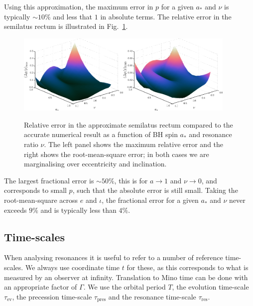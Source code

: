 \documentclass[aps,prd,amsfonts,amssymb,amsmath,nofootinbib,reprint,showpacs,superscriptaddress,twocolumn]{revtex4}
\newcommand{\figref}[1]{Fig.\ \ref{fig:#1}}
\newcommand{\sub}[1]{\ensuremath{_\text{#1}}}
\begin{document}
Using this approximation, the maximum error in $p$ for a given $a_\ast$ and $\nu$ is typically $\sim10\%$ and less that $1$ in absolute terms. The relative error in the semilatus rectum is illustrated in \figref{p-error}. 
\begin{figure}[htp]
\centering
\centerline{\includegraphics[width=0.47\textwidth]{Fig_fit-error-max-plane}\quad\includegraphics[width=0.47\textwidth]{Fig_fit-error-RMS-plane}}
\caption{\label{fig:p-error}Relative error in the approximate semilatus rectum compared to the accurate numerical result as a function of BH spin $a_\ast$ and resonance ratio $\nu$. The left panel shows the maximum relative error and the right shows the root-mean-square error; in both cases we are marginalising over eccentricity and inclination.}
\end{figure}
The largest fractional error is $\sim50\%$, this is for $a\rightarrow 1$ and $\nu \rightarrow 0$, and corresponds to small $p$, such that the absolute error is still small. Taking the root-mean-square across $e$ and $\iota$, the fractional error for a given $a_\ast$ and $\nu$ never exceeds $9\%$ and is typically less than $4\%$.

\subsection{Time-scales}\label{sec:res-time}

When analysing resonances it is useful to refer to a number of reference time-scales.  We always use coordinate time $t$ for these, as this corresponds to what is measured by an observer at infinity. Translation to Mino time can be done with an appropriate factor of $\Gamma$. We use the orbital period $T$, the evolution time-scale $\tau\sub{ev}$, the precession time-scale $\tau\sub{pres}$ and the resonance time-scale $\tau\sub{res}$.
\end{document}

